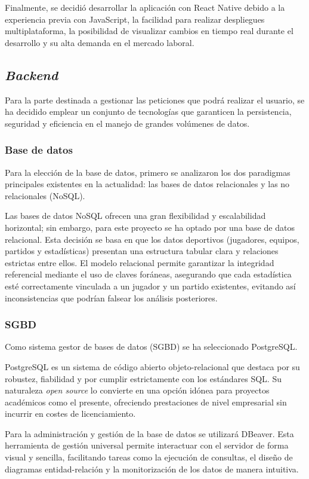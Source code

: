 Finalmente, se decidió desarrollar la aplicación con React Native debido a la experiencia previa con JavaScript, la facilidad para realizar despliegues multiplataforma, la posibilidad de visualizar cambios en tiempo real durante el desarrollo y su alta demanda en el mercado laboral.

\subsection{\textit{Backend}}
Para la parte destinada a gestionar las peticiones que podrá realizar el usuario, se ha decidido emplear un conjunto de tecnologías que garanticen la persistencia, seguridad y eficiencia en el manejo de grandes volúmenes de datos.

\subsubsection{Base de datos}
Para la elección de la base de datos, primero se analizaron los dos paradigmas principales existentes en la actualidad: las bases de datos relacionales y las no relacionales (NoSQL).

Las bases de datos NoSQL ofrecen una gran flexibilidad y escalabilidad horizontal; sin embargo, para este proyecto se ha optado por una base de datos relacional. Esta decisión se basa en que los datos deportivos (jugadores, equipos, partidos y estadísticas) presentan una estructura tabular clara y relaciones estrictas entre ellos. El modelo relacional permite garantizar la integridad referencial mediante el uso de claves foráneas, asegurando que cada estadística esté correctamente vinculada a un jugador y un partido existentes, evitando así inconsistencias que podrían falsear los análisis posteriores.

\subsubsection{SGBD}
Como sistema gestor de bases de datos (SGBD) se ha seleccionado PostgreSQL. 

PostgreSQL es un sistema de código abierto objeto-relacional que destaca por su robustez, fiabilidad y por cumplir estrictamente con los estándares SQL. Su naturaleza \textit{open source} lo convierte en una opción idónea para proyectos académicos como el presente, ofreciendo prestaciones de nivel empresarial sin incurrir en costes de licenciamiento.

Para la administración y gestión de la base de datos se utilizará DBeaver. Esta herramienta de gestión universal permite interactuar con el servidor de forma visual y sencilla, facilitando tareas como la ejecución de consultas, el diseño de diagramas entidad-relación y la monitorización de los datos de manera intuitiva.


